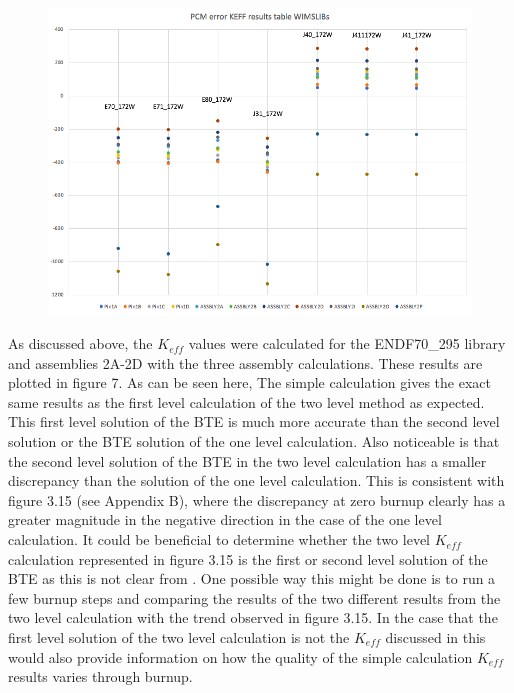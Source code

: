 \documentclass[12pt]{article}
\begin{document}
\begin{figure} [htb!]
\centering
\includegraphics[scale=0.6]{Figures/WIMSLIBs2.png}
\caption{}
\end{figure}

As discussed above, the $K_{eff}$ values were calculated for the ENDF70\_295 library and assemblies 2A-2D with the three assembly calculations. These results are plotted in figure 7. As can be seen here, The simple calculation gives the exact same results as the first level calculation of the two level method as expected. This first level solution of the BTE is much more accurate than the second level solution or the BTE solution of the one level calculation. Also noticeable is that the second level solution of the BTE in the two level calculation has a smaller discrepancy than the solution of the one level calculation. This is consistent with figure 3.15 \cite{ghasabyan2020validation} (see Appendix B), where the discrepancy at zero burnup clearly has a greater magnitude in the negative direction in the case of the one level calculation. It could be beneficial to determine whether the two level $K_{eff}$ calculation represented in figure 3.15 is the first or second level solution of the BTE as this is not clear from \cite{ghasabyan2020validation}. One possible way this might be done is to run a few burnup steps and comparing the results of the two different results from the two level calculation with the trend observed in figure 3.15. In the case that the first level solution of the two level calculation is not the $K_{eff}$ discussed in \cite{ghasabyan2020validation} this would also provide information on how the quality of the simple calculation $K_{eff}$ results varies through burnup.
\end{document}
